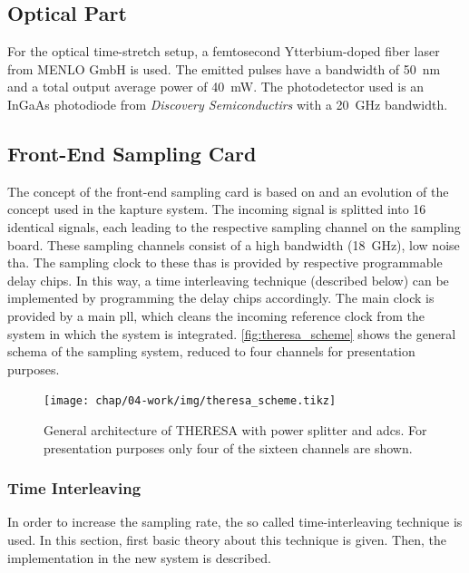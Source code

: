 \subsection*{Optical Part}
For the optical time-stretch setup, a femtosecond Ytterbium-doped fiber laser from MENLO GmbH is used. The emitted pulses have a bandwidth of \SI{50}{\nano \meter} and a total output average power of \SI{40}{\milli \watt}.
The photodetector used is an InGaAs photodiode from \textit{Discovery Semiconductirs} with a \SI{20}{\GHz} bandwidth.

\subsection*{Front-End Sampling Card}
The concept of the front-end sampling card is based on and an evolution of the concept used in the \gls{kapture} system. 
The incoming signal is splitted into 16 identical signals, each leading to the respective sampling channel on the sampling board.
These sampling channels consist of a high bandwidth (\SI{18}{\GHz}), low noise \gls{tha}.
The sampling clock to these \glspl{tha} is provided by respective programmable delay chips.
In this way, a time interleaving technique (described below) can be implemented by programming the delay chips accordingly. 
The main clock is provided by a main \gls{pll}, which cleans the incoming reference clock from the system in which the system is integrated.
\autoref{fig:theresa_scheme} shows the general schema of the sampling system, reduced to four channels for presentation purposes.
\begin{figure}[H]
	\centering
	\texttt{[image: chap/04-work/img/theresa\_scheme.tikz]}
	\caption[General architecture of THERESA]{General architecture of THERESA with power splitter and \glspl{adc}. For presentation purposes only four of the sixteen channels are shown.}
	\label{fig:theresa_scheme}
\end{figure}

\subsubsection*{Time Interleaving}\label{sssec:time-interleaving}
In order to increase the sampling rate, the so called time-interleaving technique is used. In this section, first basic theory about this technique is given. Then, the implementation in the new system is described.

